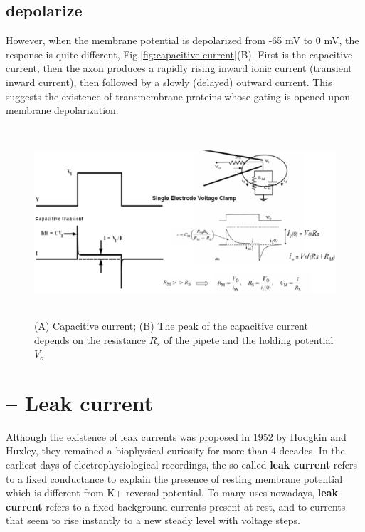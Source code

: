 
\subsection{depolarize}

However, when the membrane potential is depolarized from -65 mV to 0 mV, the
response is quite different, Fig.\ref{fig:capacitive-current}(B). First is the
capacitive current, then the axon produces a rapidly rising inward ionic
current (transient inward current), then followed by a slowly (delayed) outward
current. This suggests the existence of transmembrane proteins whose gating is
opened upon membrane depolarization.

\begin{figure}[hbtp]
  \centerline{\includegraphics[height=7cm,
    angle=0]{./images/capacitive-current-measure.eps}}
\caption{(A) Capacitive current; (B) The peak of the capacitive current depends
on the resistance $R_s$ of the pipete and the holding potential $V_o$}
\label{fig:capacitive-current-measure}
\end{figure}


\section{-- Leak current}
\label{sec:leak-current}

Although the existence of leak currents was proposed in 1952 by Hodgkin and
Huxley, they remained a biophysical curiosity for more than 4 decades.
In the earliest days of electrophysiological recordings, the so-called {\bf
leak current} refers to a fixed conductance to explain the presence of resting
membrane potential which is different from K+ reversal potential.
To many uses nowadays, {\bf leak current} refers to a fixed background currents
present at rest, and to currents that seem to rise instantly to a new steady
level with voltage steps.

